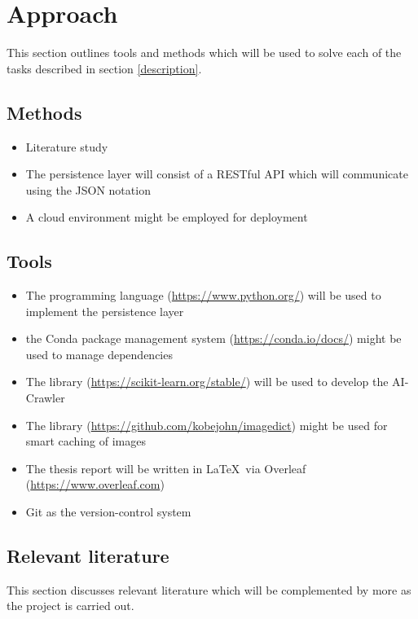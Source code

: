\section{Approach}

This section outlines tools and methods which will be used to solve each of the tasks described in section \ref{description}.

\subsection{Methods}
\begin{itemize}
    \item Literature study
    \item The persistence layer will consist of a RESTful API which will communicate using the JSON notation
    \item A cloud environment might be employed for deployment
\end{itemize}

\subsection{Tools}
 
\begin{itemize}
    \item The \Python programming language (\url{https://www.python.org/}) will be used to implement the persistence layer
    \item the Conda package management system (\url{https://conda.io/docs/}) might be used to manage \Python dependencies
    \item The \Python library \scikit (\url{https://scikit-learn.org/stable/}) will be used to develop the AI-Crawler
    \item The \Python library \ImageDict (\url{https://github.com/kobejohn/imagedict}) might be used for smart caching of images
    \item The thesis report will be written in \LaTeX ~via Overleaf (\url{https://www.overleaf.com})
    \item Git as the version-control system
\end{itemize}

\subsection{Relevant literature}

This section discusses relevant literature which will be complemented by more as the project is carried out.

